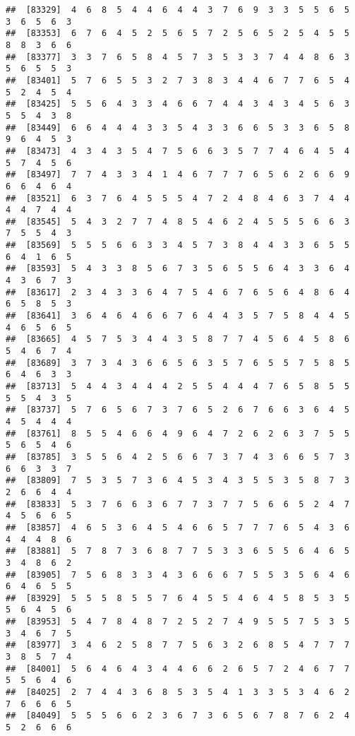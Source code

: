 \documentclass[
]{book}
\begin{document}
\begin{verbatim}
##  [83329]  4  6  8  5  4  4  6  4  4  3  7  6  9  3  3  5  5  6  5  3  6  5  6  3
##  [83353]  6  7  6  4  5  2  5  6  5  7  2  5  6  5  2  5  4  5  5  8  8  3  6  6
##  [83377]  3  3  7  6  5  8  4  5  7  3  5  3  3  7  4  4  8  6  3  5  6  5  5  3
##  [83401]  5  7  6  5  5  3  2  7  3  8  3  4  4  6  7  7  6  5  4  5  2  4  5  4
##  [83425]  5  5  6  4  3  3  4  6  6  7  4  4  3  4  3  4  5  6  3  5  5  4  3  8
##  [83449]  6  6  4  4  4  3  3  5  4  3  3  6  6  5  3  3  6  5  8  9  6  4  5  3
##  [83473]  4  3  4  3  5  4  7  5  6  6  3  5  7  7  4  6  4  5  4  5  7  4  5  6
##  [83497]  7  7  4  3  3  4  1  4  6  7  7  7  6  5  6  2  6  6  9  6  6  4  6  4
##  [83521]  6  3  7  6  4  5  5  5  4  7  2  4  8  4  6  3  7  4  4  4  4  7  4  4
##  [83545]  5  4  3  2  7  7  4  8  5  4  6  2  4  5  5  5  6  6  3  7  5  5  4  3
##  [83569]  5  5  5  6  6  3  3  4  5  7  3  8  4  4  3  3  6  5  5  6  4  1  6  5
##  [83593]  5  4  3  3  8  5  6  7  3  5  6  5  5  6  4  3  3  6  4  4  3  6  7  3
##  [83617]  2  3  4  3  3  6  4  7  5  4  6  7  6  5  6  4  8  6  4  6  5  8  5  3
##  [83641]  3  6  4  6  4  6  6  7  6  4  4  3  5  7  5  8  4  4  5  4  6  5  6  5
##  [83665]  4  5  7  5  3  4  4  3  5  8  7  7  4  5  6  4  5  8  6  5  4  6  7  4
##  [83689]  3  7  3  4  3  6  6  5  6  3  5  7  6  5  5  7  5  8  5  6  4  6  3  3
##  [83713]  5  4  4  3  4  4  4  2  5  5  4  4  4  7  6  5  8  5  5  5  5  4  3  5
##  [83737]  5  7  6  5  6  7  3  7  6  5  2  6  7  6  6  3  6  4  5  4  5  4  4  4
##  [83761]  8  5  5  4  6  6  4  9  6  4  7  2  6  2  6  3  7  5  5  5  6  5  4  6
##  [83785]  3  5  5  6  4  2  5  6  6  7  3  7  4  3  6  6  5  7  3  6  6  3  3  7
##  [83809]  7  5  3  5  7  3  6  4  5  3  4  3  5  5  3  5  8  7  3  2  6  6  4  4
##  [83833]  5  3  7  6  6  3  6  7  7  3  7  7  5  6  6  5  2  4  7  4  5  6  6  5
##  [83857]  4  6  5  3  6  4  5  4  6  6  5  7  7  7  6  5  4  3  6  4  4  4  8  6
##  [83881]  5  7  8  7  3  6  8  7  7  5  3  3  6  5  5  6  4  6  5  3  4  8  6  2
##  [83905]  7  5  6  8  3  3  4  3  6  6  6  7  5  5  3  5  6  4  6  6  4  6  5  5
##  [83929]  5  5  5  8  5  5  7  6  4  5  5  4  6  4  5  8  5  3  5  5  6  4  5  6
##  [83953]  5  4  7  8  4  8  7  2  5  2  7  4  9  5  5  7  5  3  5  3  4  6  7  5
##  [83977]  3  4  6  2  5  8  7  7  5  6  3  2  6  8  5  4  7  7  7  3  8  5  7  4
##  [84001]  5  6  4  6  4  3  4  4  6  6  2  6  5  7  2  4  6  7  7  5  5  6  4  6
##  [84025]  2  7  4  4  3  6  8  5  3  5  4  1  3  3  5  3  4  6  2  7  6  6  6  5
##  [84049]  5  5  5  6  6  2  3  6  7  3  6  5  6  7  8  7  6  2  4  5  2  6  6  6

\end{verbatim}
\end{document}
